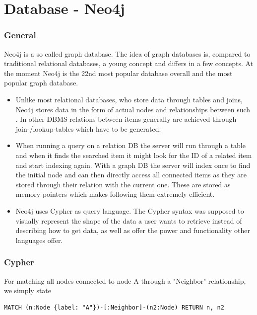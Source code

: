 \section{Database - Neo4j}
\subsubsection{General}
Neo4j is a so called graph database. The idea of graph databases is, compared to traditional relational databases, a young concept and differs in a few concepts. At the moment Neo4j is the 22nd most popular database overall \cite{DbEnginesGeneral} and the most popular graph database. \cite{DbEnginesGraph}

\begin{itemize}
\item Unlike most relational databases, who store data through tables and joins, Neo4j stores data in the form of actual nodes and relationships between such \cite{Neo4jDevGuides}. In other DBMS relations between items generally are achieved through join-/lookup-tables which have to be generated. \cite{RelVsGraph}

\item When running a query on a relation DB the server will run through a table and when it finds the searched item it might look for the ID of a related item and start indexing again. With a graph DB the server will index \citep[minute 32]{NeoInternals} once to find the initial node and can then directly access all connected items as they are stored through their relation with the current one. \cite{WhatGraphDB} These are stored as memory pointers which makes following them extremely efficient.
\item Neo4j uses Cypher as query language. The Cypher syntax was supposed to visually represent the shape of the data a user wants to retrieve instead of describing how to get data, as well as offer the power and functionality other languages offer. \cite{Neo4jCypher} 
\end{itemize}

\subsubsection{Cypher}
For matching all nodes connected to node A through a "Neighbor" relationship, we simply state
\lstset{language=Cypher}
\begin{lstlisting}[label={ex231},caption={Matching Nodes Way 1}]
MATCH (n:Node {label: "A"})-[:Neighbor]-(n2:Node) RETURN n, n2
\end{lstlisting}


